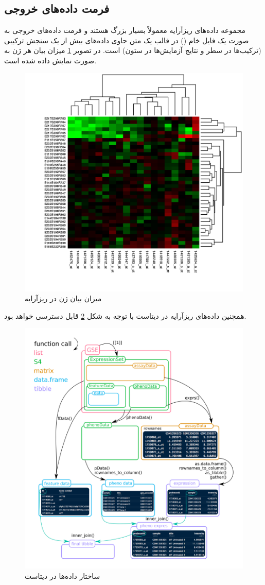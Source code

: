 \documentclass{article}
\begin{document}
 \subsection*{فرمت داده‌‌های خروجی}
مجموعه داده‌های ریزآرایه معمولاً بسیار بزرگ هستند و فرمت داده‌های خروجی به صورت یک فایل خام () در قالب یک متن  حاوی داده‌های بیش از یک سنجش ترکیبی (ترکیب‌ها در سطر‌ و نتایج آزمایش‌ها در ستون) است.
در تصویر \ref{fig:microarray} میزان بیان هر ژن به صورت  نمایش داده شده است.
\begin{figure}[h!]
	\centering
	\includegraphics[width=0.5\columnwidth]{figs/microarray.png}
	\caption{میزان بیان ژن در ریزآرایه \cite{wiki-microarray}}
	\label{fig:microarray}
\end{figure}

همچنین داده‌های ریزآرایه در دیتاست با توجه به شکل \ref{fig:geo-data} قابل دسترسی خواهد بود.
\begin{figure}[h!]
 	\centering
 	\includegraphics[width=0.8\columnwidth]{figs/geo-data.png}
 	\caption{ساختار داده‌ها در دیتاست \cite{geo-data}}
 	\label{fig:geo-data}
\end{figure}
\end{document}
